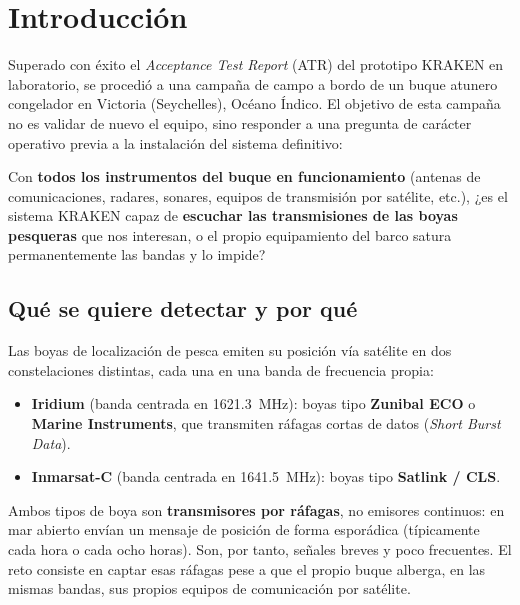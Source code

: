 \section{Introducción}

Superado con éxito el \textit{Acceptance Test Report} (ATR) del prototipo KRAKEN en laboratorio, se procedió a una campaña de campo a bordo de un buque atunero congelador en Victoria (Seychelles), Océano Índico. El objetivo de esta campaña no es validar de nuevo el equipo, sino responder a una pregunta de carácter operativo previa a la instalación del sistema definitivo:

\begin{tcolorbox}[colback=deyposcolor!5, colframe=deyposcolor, title=Pregunta que responde este informe]
Con \textbf{todos los instrumentos del buque en funcionamiento} (antenas de comunicaciones, radares, sonares, equipos de transmisión por satélite, etc.), ¿es el sistema KRAKEN capaz de \textbf{escuchar las transmisiones de las boyas pesqueras} que nos interesan, o el propio equipamiento del barco satura permanentemente las bandas y lo impide?
\end{tcolorbox}

\subsection{Qué se quiere detectar y por qué}

Las boyas de localización de pesca emiten su posición vía satélite en dos constelaciones distintas, cada una en una banda de frecuencia propia:

\begin{itemize}
    \item \textbf{Iridium} (banda centrada en \SI{1621.3}{\mega\hertz}): boyas tipo \textbf{Zunibal ECO} o \textbf{Marine Instruments}, que transmiten ráfagas cortas de datos (\textit{Short Burst Data}).
    \item \textbf{Inmarsat-C} (banda centrada en \SI{1641.5}{\mega\hertz}): boyas tipo \textbf{Satlink / CLS}.
\end{itemize}

Ambos tipos de boya son \textbf{transmisores por ráfagas}, no emisores continuos: en mar abierto envían un mensaje de posición de forma esporádica (típicamente cada hora o cada ocho horas). Son, por tanto, señales breves y poco frecuentes. El reto consiste en captar esas ráfagas pese a que el propio buque alberga, en las mismas bandas, sus propios equipos de comunicación por satélite.

